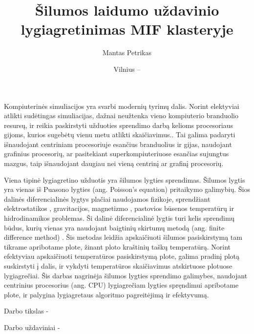\documentclass{VUMIFPSbakalaurinis}
\title{Šilumos laidumo uždavinio lygiagretinimas MIF klasteryje}
\author{Mantas Petrikas}
\date{Vilnius – \the\year}
\begin{document}
\maketitle



\tableofcontents



Kompiuterinės simuliacijos yra svarbi modernių tyrimų dalis. 
Norint elektyviai atlikti sudėtingas simuliacijas, dažnai neužtenka vieno kompiuterio branduolio resursų, ir reikia paskirstyti užduoties sprendimo darbą kelioms procesoriaus gijoms, kurios sugebėtų vienu metu atlikti skaičiavimus..
Tai galima padaryti išnaudojant centriniam procesoriuje esančius branduolius ir gijas, naudojant grafinius procesorių, ar pasitekiant superkompiuteriuose esančias sujungtus mazgus, taip išnaudojant daugiau nei vieną centrinį ar grafinį procesorių.


Viena tipinė lygiagretino užduotis yra šilumos lygties sprendimas. 
Šilumos lygtis yra vienas iš Puasono lygties (ang. Poisson's equation) pritaikymo galimybių. 
Šios dalinės diferencialinės lygtys plačiai naudojamos fizikoje, sprendžiant elektrostatikos \cite{house2008analytic}, gravitacijos, magnetizmo \cite{blakely1996potential}, pastovios būsenos temperatūrų \cite {berntsson2001numerical} ir hidrodinamikos \cite{kadanoff1985simulating} problemas. 
Ši dalinė diferencialinė lygtis turi kelis sprendimų būdus, kurių vienas yra naudojant baigtinių skirtumų metodą (ang. finite difference method) \cite{yoon2015analyses}.
Šis metodas leidžia apskaičiuoti šilumos pasiskirstymą tam tikrame apribotame plote, žinant ploto kraštinių taškų temperatūrą.
Norint efektyviau apskaičiuoti temperatūros pasiskirstymą plote, galima pradinį plotą suskirstyti į dalis, ir vykdyti temperatūros skaičiavimus atskirtuose plotuose lygiagrečiai.
Šis darbas nagrinėja šilumos lygties sprendimo galimybes, naudojant centrinius procesorius (ang. CPU) lygiagrečiam lygties spręndimui apribotame plote, ir palygina lygiagretaus algoritmo pagreitėjimą ir efektyvumą. 

Darbo tikslas - 

Darbo uždaviniai -



\end{document}
